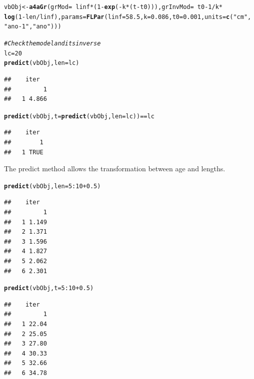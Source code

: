 \documentclass[a4paper,english,10pt]{article}\usepackage[]{graphicx}\usepackage[]{color}
\makeatletter
\newcommand{\hlnum}[1]{\textcolor[rgb]{0.686,0.059,0.569}{#1}}%
\newcommand{\hlstr}[1]{\textcolor[rgb]{0.192,0.494,0.8}{#1}}%
\newcommand{\hlcom}[1]{\textcolor[rgb]{0.678,0.584,0.686}{\textit{#1}}}%
\newcommand{\hlopt}[1]{\textcolor[rgb]{0,0,0}{#1}}%
\newcommand{\hlstd}[1]{\textcolor[rgb]{0.345,0.345,0.345}{#1}}%
\newcommand{\hlkwb}[1]{\textcolor[rgb]{0.69,0.353,0.396}{#1}}%
\newcommand{\hlkwc}[1]{\textcolor[rgb]{0.333,0.667,0.333}{#1}}%
\newcommand{\hlkwd}[1]{\textcolor[rgb]{0.737,0.353,0.396}{\textbf{#1}}}%
\newenvironment{kframe}{%
 \def\at@end@of@kframe{}%
 \ifinner\ifhmode%
  \def\at@end@of@kframe{\end{minipage}}%
  \begin{minipage}{\columnwidth}%
 \fi\fi%
 \def\FrameCommand##1{\hskip\@totalleftmargin \hskip-\fboxsep
 \colorbox{shadecolor}{##1}\hskip-\fboxsep
     \hskip-\linewidth \hskip-\@totalleftmargin \hskip\columnwidth}%
 \MakeFramed {\advance\hsize-\width
   \@totalleftmargin\z@ \linewidth\hsize
   \@setminipage}}%
 {\par\unskip\endMakeFramed%
 \at@end@of@kframe}
\newenvironment{knitrout}{}{} %
\makeatother
\begin{document}
\begin{knitrout}
\color{fgcolor}\begin{kframe}
\begin{alltt}
\hlstd{vbObj} \hlkwb{<-} \hlkwd{a4aGr}\hlstd{(}\hlkwc{grMod} \hlstd{=} \hlopt{~}\hlstd{linf} \hlopt{*} \hlstd{(}\hlnum{1} \hlopt{-} \hlkwd{exp}\hlstd{(}\hlopt{-}\hlstd{k} \hlopt{*} \hlstd{(t} \hlopt{-} \hlstd{t0))),} \hlkwc{grInvMod} \hlstd{=} \hlopt{~}\hlstd{t0} \hlopt{-} \hlnum{1}\hlopt{/}\hlstd{k} \hlopt{*}
    \hlkwd{log}\hlstd{(}\hlnum{1} \hlopt{-} \hlstd{len}\hlopt{/}\hlstd{linf),} \hlkwc{params} \hlstd{=} \hlkwd{FLPar}\hlstd{(}\hlkwc{linf} \hlstd{=} \hlnum{58.5}\hlstd{,} \hlkwc{k} \hlstd{=} \hlnum{0.086}\hlstd{,} \hlkwc{t0} \hlstd{=} \hlnum{0.001}\hlstd{,} \hlkwc{units} \hlstd{=} \hlkwd{c}\hlstd{(}\hlstr{"cm"}\hlstd{,}
    \hlstr{"ano-1"}\hlstd{,} \hlstr{"ano"}\hlstd{)))}

\hlcom{# Check the model and its inverse}
\hlstd{lc} \hlkwb{=} \hlnum{20}
\hlkwd{predict}\hlstd{(vbObj,} \hlkwc{len} \hlstd{= lc)}
\end{alltt}
\begin{verbatim}
##    iter
##         1
##   1 4.866
\end{verbatim}
\begin{alltt}
\hlkwd{predict}\hlstd{(vbObj,} \hlkwc{t} \hlstd{=} \hlkwd{predict}\hlstd{(vbObj,} \hlkwc{len} \hlstd{= lc))} \hlopt{==} \hlstd{lc}
\end{alltt}
\begin{verbatim}
##    iter
##        1
##   1 TRUE
\end{verbatim}
\end{kframe}
\end{knitrout}


The predict method allows the transformation between age and lengths.

\begin{knitrout}
\color{fgcolor}\begin{kframe}
\begin{alltt}
\hlkwd{predict}\hlstd{(vbObj,} \hlkwc{len} \hlstd{=} \hlnum{5}\hlopt{:}\hlnum{10} \hlopt{+} \hlnum{0.5}\hlstd{)}
\end{alltt}
\begin{verbatim}
##    iter
##         1
##   1 1.149
##   2 1.371
##   3 1.596
##   4 1.827
##   5 2.062
##   6 2.301
\end{verbatim}
\begin{alltt}
\hlkwd{predict}\hlstd{(vbObj,} \hlkwc{t} \hlstd{=} \hlnum{5}\hlopt{:}\hlnum{10} \hlopt{+} \hlnum{0.5}\hlstd{)}
\end{alltt}
\begin{verbatim}
##    iter
##         1
##   1 22.04
##   2 25.05
##   3 27.80
##   4 30.33
##   5 32.66
##   6 34.78
\end{verbatim}
\end{kframe}
\end{knitrout}
\end{document}

